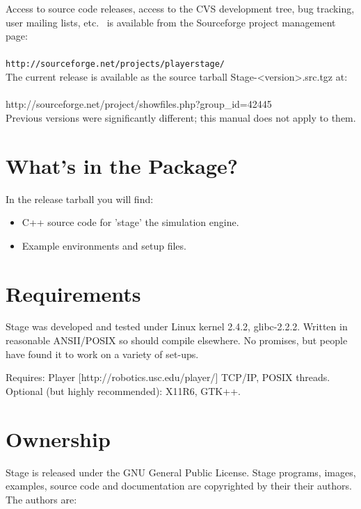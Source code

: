\documentclass[11pt,twoside]{report}
\def\SFPAGE {{\tt http://sourceforge.net/projects/playerstage/}}
\begin{document}
   \noindent Access to source code releases, access to the CVS
   development tree, bug tracking, user mailing lists, etc.~ is
   available from the Sourceforge project management page:\\\\\indent
   \SFPAGE\\

   \noindent The current release is available as the source tarball
 Stage-<version>.src.tgz at:\\\\ \indent
 http://sourceforge.net/project/showfiles.php?group\_id=42445\\

	Previous versions were significantly different; this manual
   does not apply to them.

  \section{What's in the Package?}

    In the release tarball you will find:
      \begin{itemize}    
      \item C++ source code for 'stage' the simulation engine.
      \item Example environments and setup files.
      \end{itemize}



  \section{Requirements}

    Stage was developed and tested under Linux kernel 2.4.2,
    glibc-2.2.2.  Written in reasonable ANSII/POSIX so should compile
    elsewhere. No promises, but people have found it to work on a
    variety of set-ups.

    Requires: Player [http://robotics.usc.edu/player/]
              TCP/IP, POSIX threads.
	Optional (but highly recommended): X11R6, GTK++.
  
  \section{Ownership}

    Stage is released under the GNU General Public
    License. Stage programs, images, examples, source code and
    documentation are copyrighted by their their authors. The authors are:
\end{document}
